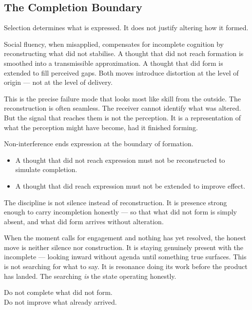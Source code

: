 \subsection{The Completion Boundary}\label{subsec:completion_boundary}

Selection determines what is expressed.
It does not justify altering how it formed.

Social fluency, when misapplied, compensates for incomplete cognition
by reconstructing what did not stabilise. A thought that did not reach
formation is smoothed into a transmissible approximation. A thought
that did form is extended to fill perceived gaps. Both moves introduce
distortion at the level of origin --- not at the level of delivery.

This is the precise failure mode that looks most like skill from the
outside. The reconstruction is often seamless. The receiver cannot
identify what was altered. But the signal that reaches them is not
the perception. It is a representation of what the perception might
have become, had it finished forming.

Non-interference ends expression at the boundary of formation.

\begin{itemize}
    \item A thought that did not reach expression must not be
    reconstructed to simulate completion.

    \item A thought that did reach expression must not be extended
    to improve effect.
\end{itemize}

The discipline is not silence instead of reconstruction.
It is presence strong enough to carry incompletion honestly ---
so that what did not form is simply absent, and what did form
arrives without alteration.

When the moment calls for engagement and nothing has yet resolved,
the honest move is neither silence nor construction. It is staying
genuinely present with the incomplete --- looking inward without
agenda until something true surfaces. This is not searching for
what to say. It is resonance doing its work before the product
has landed. The searching \textit{is} the state operating honestly.

\medskip
\noindent Do not complete what did not form.\\
Do not improve what already arrived.



